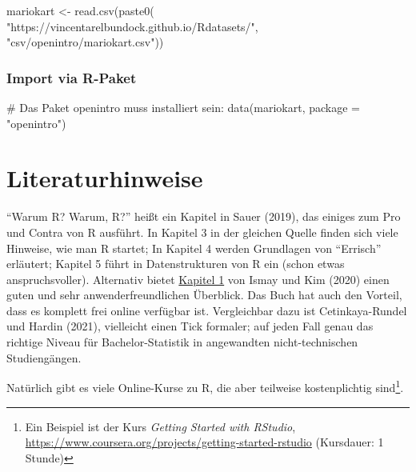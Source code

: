 \documentclass[
  a4paper,
  DIV=11]{scrreprt}
\newenvironment{Shaded}{\begin{snugshade}}{\end{snugshade}}
\newcommand{\AttributeTok}[1]{\textcolor[rgb]{0.40,0.45,0.13}{#1}}
\newcommand{\CommentTok}[1]{\textcolor[rgb]{0.37,0.37,0.37}{#1}}
\newcommand{\FunctionTok}[1]{\textcolor[rgb]{0.28,0.35,0.67}{#1}}
\newcommand{\NormalTok}[1]{\textcolor[rgb]{0.00,0.23,0.31}{#1}}
\newcommand{\OtherTok}[1]{\textcolor[rgb]{0.00,0.23,0.31}{#1}}
\newcommand{\StringTok}[1]{\textcolor[rgb]{0.13,0.47,0.30}{#1}}
\theoremstyle{definition}
\theoremstyle{definition}
\theoremstyle{definition}
\theoremstyle{remark}
\begin{document}
\begin{Shaded}
\begin{Highlighting}[]
\NormalTok{mariokart }\OtherTok{\textless{}{-}} \FunctionTok{read.csv}\NormalTok{(}\FunctionTok{paste0}\NormalTok{(}
  \StringTok{"https://vincentarelbundock.github.io/Rdatasets/"}\NormalTok{,}
  \StringTok{"csv/openintro/mariokart.csv"}\NormalTok{))}
\end{Highlighting}
\end{Shaded}

\subsubsection{Import via R-Paket}\label{import-via-r-paket}

\begin{Shaded}
\begin{Highlighting}[]
\CommentTok{\# Das Paket \textquotesingle{}openintro\textquotesingle{} muss installiert sein:}
\FunctionTok{data}\NormalTok{(mariokart, }\AttributeTok{package =} \StringTok{"openintro"}\NormalTok{) }
\end{Highlighting}
\end{Shaded}

\section{Literaturhinweise}\label{literaturhinweise-1}

``Warum R? Warum, R?'' heißt ein Kapitel in Sauer (2019), das einiges
zum Pro und Contra von R ausführt. In Kapitel 3 in der gleichen Quelle
finden sich viele Hinweise, wie man R startet; In Kapitel 4 werden
Grundlagen von ``Errisch'' erläutert; Kapitel 5 führt in Datenstrukturen
von R ein (schon etwas anspruchsvoller). Alternativ bietet
\href{https://moderndive.com/1-getting-started.html}{Kapitel 1} von
Ismay und Kim (2020) einen guten und sehr anwenderfreundlichen
Überblick. Das Buch hat auch den Vorteil, dass es komplett frei online
verfügbar ist. Vergleichbar dazu ist Cetinkaya-Rundel und Hardin (2021),
vielleicht einen Tick formaler; auf jeden Fall genau das richtige Niveau
für Bachelor-Statistik in angewandten nicht-technischen Studiengängen.

Natürlich gibt es viele Online-Kurse zu R, die aber teilweise
kostenplichtig sind\footnote{Ein Beispiel ist der Kurs \emph{Getting
  Started with RStudio},
  \url{https://www.coursera.org/projects/getting-started-rstudio}
  (Kursdauer: 1 Stunde)}.
\end{document}
